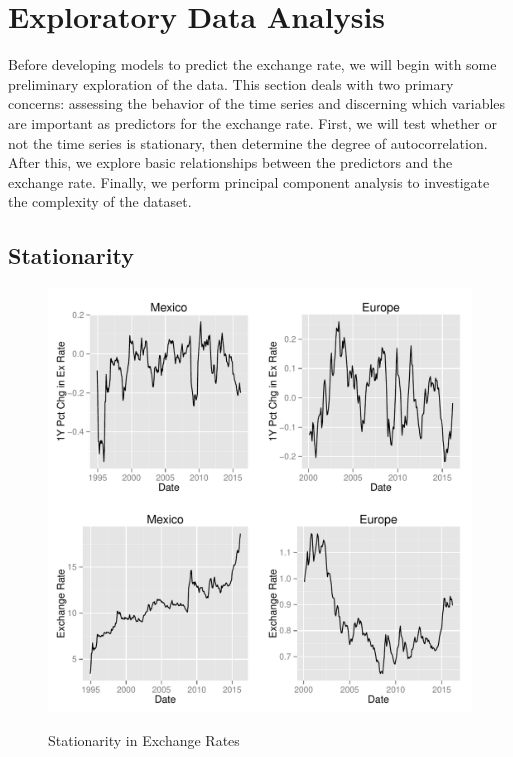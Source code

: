 \documentclass{sig-alternate-05-2015}
\begin{document}
\section{Exploratory Data Analysis}

Before developing models to predict the exchange rate, we will begin with some preliminary exploration of the data. This section deals with two primary concerns: assessing the behavior of the time series and discerning which variables are important as predictors for the exchange rate. First, we will test whether or not the time series is stationary, then determine the degree of autocorrelation. After this, we explore basic relationships between the predictors and the exchange rate. Finally, we perform principal component analysis to investigate the complexity of the dataset.

\subsection{Stationarity}

\begin{figure}
\centering
\caption{Stationarity in Exchange Rates}
\includegraphics[scale=0.45]{stationarity.pdf}
\label{fig:rates_time}
\end{figure}
\end{document}
